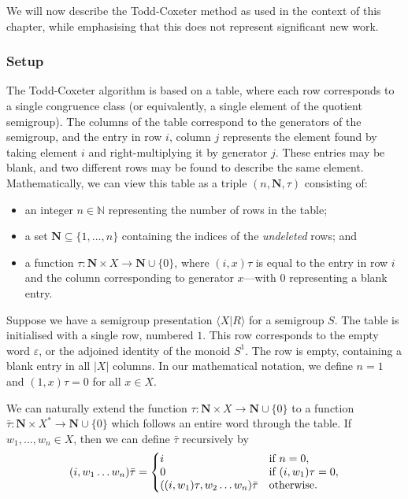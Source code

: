 We will now describe the Todd-Coxeter method as used in the context of this
chapter, while emphasising that this does not represent significant new work.

\subsubsection{Setup}

The Todd-Coxeter algorithm is based on a table, where each row corresponds to a
single congruence class (or equivalently, a single element of the quotient
semigroup).  The columns of the table correspond to the generators of the
semigroup, and the entry in row $i$, column $j$ represents the element found by
taking element $i$ and right-multiplying it by generator $j$.  These entries may
be blank, and two different rows may be found to describe the same element.
Mathematically, we can view this table as a triple $(n, \mathbf{N}, \tau)$
consisting of:
\begin{itemize}
\item an integer $n \in \mathbb{N}$ representing the number of rows in the table;
\item a set $\mathbf{N} \subseteq \{1, \dots, n\}$ containing the indices of the
  \textit{undeleted} rows; and
\item a function $\tau: \mathbf{N} \times X \to \mathbf{N} \cup \{0\}$, where
  $(i, x)\tau$ is equal to the entry in row $i$ and the column corresponding to
  generator $x$---with $0$ representing a blank entry.
\end{itemize}

Suppose we have a semigroup presentation $\langle X | R \rangle$ for a semigroup
$S$.  The table is initialised with a single row, numbered $1$.  This row
corresponds to the empty word $\varepsilon$, or the adjoined identity of the
monoid $S^1$.  The row is empty, containing a blank entry in all $|X|$ columns.
In our mathematical notation, we define $n=1$ and
$(1,x)\tau = 0$ for all $x \in X$.

We can naturally extend the function
$\tau: \mathbf{N} \times X \to \mathbf{N} \cup \{0\}$
to a function 
$\bar{\tau}: \mathbf{N} \times X^* \to \mathbf{N} \cup \{0\}$
which follows an entire word through the table.  If $w_1, \dots, w_n \in X$,
then we can define $\bar\tau$ recursively by
$$
(i, w_1 \dots w_n)\bar\tau = \left\{
\begin{matrix*}[l]
  i & \textnormal{if~} n=0,\\
  0 & \textnormal{if~} (i, w_1)\tau=0,\\
  ((i, w_1)\tau, w_2 \dots w_n)\bar\tau & \textnormal{otherwise}.
\end{matrix*} \right.
$$

